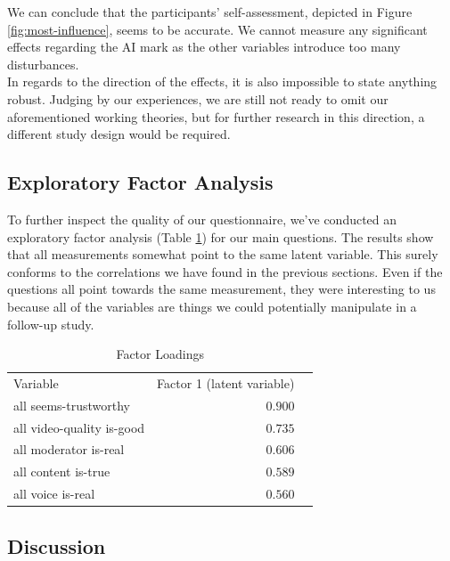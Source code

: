 \documentclass[
  a4paper,  %
  twoside,  %
  bibliography=totoc,
  headsepline,
  cleardoublepage=empty,
  parskip=half,
  draft=false
]{scrbook}
\begin{document}
We can conclude that the participants' self-assessment, depicted in Figure \ref{fig:most-influence}, seems to be accurate. We cannot measure any significant effects regarding the AI mark as the other variables introduce too many disturbances. \\
In regards to the direction of the effects, it is also impossible to state anything robust. Judging by our experiences, we are still not ready to omit our aforementioned working theories, but for further research in this direction, a different study design would be required.

 \subsection{Exploratory Factor Analysis}
\label{subsec:factor-analysis}

To further inspect the quality of our questionnaire, we've conducted an exploratory factor analysis (Table \ref{tab:factorLoadings}) for our main questions. The results show that all measurements somewhat point to the same latent variable. This surely conforms to the correlations we have found in the previous sections. Even if the questions all point towards the same measurement, they were interesting to us because all of the variables are things we could potentially manipulate in a follow-up study.

\begin{table}[h]
	\centering
	\caption{Factor Loadings}
	\label{tab:factorLoadings}
	{
		\begin{tabular}{lrr}
			\toprule
			Variable & Factor 1 (latent variable)  \\
			\cmidrule[0.4pt]{1-2}
			all seems-trustworthy & $0.900$  \\
			all video-quality is-good & $0.735$  \\
			all moderator is-real & $0.606$  \\
			all content is-true & $0.589$  \\
			all voice is-real & $0.560$  \\
			\bottomrule
		\end{tabular}
	}
\end{table}

\subsection{Discussion}
\end{document}

